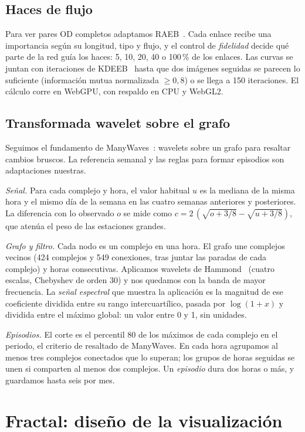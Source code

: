 \documentclass[conference,a4paper]{IEEEtran}
\begin{document}
\subsection{Haces de flujo}
Para ver pares OD completos adaptamos RAEB~\cite{raeb}. Cada enlace recibe una importancia según su longitud, tipo y flujo, y el control de \emph{fidelidad} decide qué parte de la red guía los haces: 5, 10, 20, 40 o 100\,\% de los enlaces. Las curvas se juntan con iteraciones de KDEEB~\cite{kdeeb} hasta que dos imágenes seguidas se parecen lo suficiente (información mutua normalizada $\geq 0{,}8$) o se llega a 150 iteraciones. El cálculo corre en WebGPU, con respaldo en CPU y WebGL2.

\subsection{Transformada wavelet sobre el grafo}
Seguimos el fundamento de ManyWaves~\cite{manywaves}: wavelets sobre un grafo para resaltar cambios bruscos. La referencia semanal y las reglas para formar episodios son adaptaciones nuestras.

\emph{Señal.} Para cada complejo y hora, el valor habitual $u$ es la mediana de la misma hora y el mismo día de la semana en las cuatro semanas anteriores y posteriores. La diferencia con lo observado $o$ se mide como $c=2\,(\sqrt{o+3/8}-\sqrt{u+3/8})$, que atenúa el peso de las estaciones grandes.

\emph{Grafo y filtro.} Cada nodo es un complejo en una hora. El grafo une complejos vecinos (424 complejos y 549 conexiones, tras juntar las paradas de cada complejo) y horas consecutivas. Aplicamos wavelets de Hammond~\cite{hammond} (cuatro escalas, Chebyshev de orden 30) y nos quedamos con la banda de mayor frecuencia. La \emph{señal espectral} que muestra la aplicación es la magnitud de ese coeficiente dividida entre su rango intercuartílico, pasada por $\log(1+x)$ y dividida entre el máximo global: un valor entre 0 y 1, sin unidades.

\emph{Episodios.} El corte es el percentil 80 de los máximos de cada complejo en el periodo, el criterio de resaltado de ManyWaves. En cada hora agrupamos al menos tres complejos conectados que lo superan; los grupos de horas seguidas se unen si comparten al menos dos complejos. Un \emph{episodio} dura dos horas o más, y guardamos hasta seis por mes.



\section{Fractal: diseño de la visualización}
\end{document}
